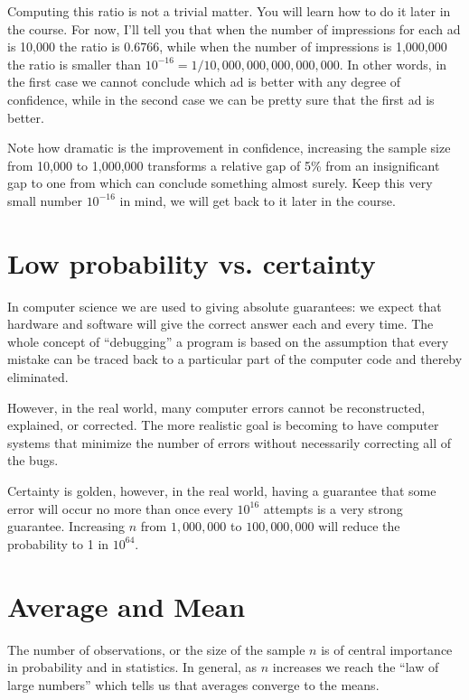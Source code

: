 Computing this ratio is not a trivial matter. You will learn how to
do it later in the course. For now, I'll tell you that when the number
of impressions for each ad is 10,000 the ratio is $0.6766$, while when
the number of impressions is 1,000,000 the ratio is smaller than
$10^{-16} = 1/10,000,000,000,000,000$. In other words, in the first
case we cannot conclude which ad is better with any degree of
confidence, while in the second case we can be pretty sure that the
first ad is better.

Note how dramatic is the improvement in confidence, increasing the
sample size from 10,000 to 1,000,000 transforms a relative gap of 5\%
from an insignificant gap to one from which can conclude something
almost surely. Keep this very small number $10^{-16}$ in mind, we will
get back to it later in the course.

\section{Low probability vs. certainty}
In computer science we are used to giving absolute guarantees: we
expect that hardware and software will give the correct answer each 
and every time. The whole concept of ``debugging'' a program is based
on the assumption that every mistake can be traced back to a
particular part of the computer code and thereby eliminated. 

However, in the real world, many computer errors cannot be
reconstructed, explained, or corrected. The more realistic goal is
becoming to have computer systems that minimize the number of errors
without necessarily correcting all of the bugs.

Certainty is golden, however, in the real world, having a guarantee
that some error will occur no more than once every $10^{16}$ attempts
is a very strong guarantee. Increasing $n$ from $1,000,000$ to
$100,000,000$ will reduce the probability to 1 in $10^{64}$.

\section{Average and Mean}
The number of observations, or the size of the sample $n$ is of
central importance in probability and in statistics. In general, as
$n$ increases we reach the ``law of large numbers'' which tells us
that averages converge to the means.

